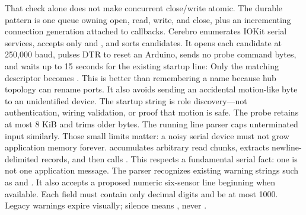 {}\markdownRendererInterblockSeparator
{}That check alone does not make concurrent close/write atomic. The durable pattern is one queue owning open, read, write, and close, plus an incrementing connection generation attached to callbacks.\markdownRendererInterblockSeparator
{}
\markdownRendererSectionEnd 
\markdownRendererSectionEnd \markdownRendererSectionBegin
{}\markdownRendererInterblockSeparator
{}Cerebro enumerates IOKit serial services, accepts only  and , and sorts candidates. It opens each candidate at 250,000 baud, pulses DTR to reset an Arduino, sends no probe command bytes, and waits up to 15 seconds for the existing startup line:\markdownRendererInterblockSeparator
{}\markdownRendererInterblockSeparator
{}Only the matching descriptor becomes . This is better than remembering a  name because hub topology can rename ports. It also avoids sending an accidental motion-like byte to an unidentified device. The startup string is role discovery—not authentication, wiring validation, or proof that motion is safe.\markdownRendererParagraphSeparator
{}The probe retains at most 8 KiB and trims older bytes. The running line parser caps unterminated input similarly. Those small limits matter: a noisy serial device must not grow application memory forever.\markdownRendererInterblockSeparator
{}\markdownRendererSectionBegin
{}\markdownRendererInterblockSeparator
{} accumulates arbitrary read chunks, extracts newline-delimited records, and then calls . This respects a fundamental serial fact: one  is not one application message.\markdownRendererParagraphSeparator
{}The parser recognizes existing warning strings such as  and . It also accepts a proposed numeric six-sensor line beginning  when available. Each field must contain only decimal digits and be at most 1000. Legacy warnings expire visually; silence means , never .\markdownRendererInterblockSeparator

